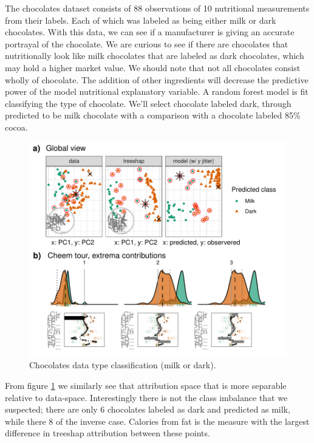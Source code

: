 \documentclass[
]{article}
\begin{document}
The chocolates dataset consists of 88 observations of 10 nutritional measurements from their labels. Each of which was labeled as being either milk or dark chocolates. With this data, we can see if a manufacturer is giving an accurate portrayal of the chocolate. We are curious to see if there are chocolates that nutritionally look like milk chocolates that are labeled as dark chocolates, which may hold a higher market value. We should note that not all chocolates consist wholly of chocolate. The addition of other ingredients will decrease the predictive power of the model nutritional explanatory variable. A random forest model is fit classifying the type of chocolate. We'll select chocolate labeled dark, through predicted to be milk chocolate with a comparison with a chocolate labeled 85\% cocoa.

\begin{figure}

{\centering \includegraphics[width=1\linewidth]{./figures/case_chocolates} 

}

\caption{Chocolates data  type classification (milk or dark). }\label{fig:casechocolates}
\end{figure}

From figure \ref{fig:casechocolates} we similarly see that attribution space that is more separable relative to data-space. Interestingly there is not the class imbalance that we suspected; there are only 6 chocolates labeled as dark and predicted as milk, while there 8 of the inverse case. Calories from fat is the measure with the largest difference in treeshap attribution between these points.
\end{document}
